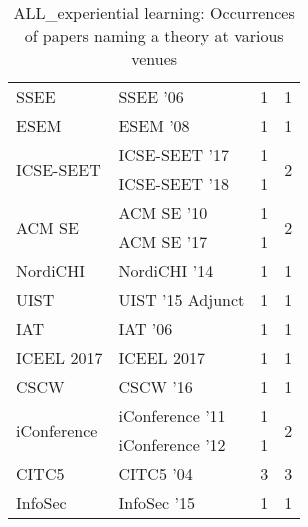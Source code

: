 \begin{table*}[t]
\begin{tabular}{llrr}
\multirow{1}{*}{SSEE } & SSEE '06 & 1 & \multirow{1}{*}{1}\\
\multirow{1}{*}{ESEM } & ESEM '08 & 1 & \multirow{1}{*}{1}\\
\multirow{2}{*}{ICSE-SEET } & ICSE-SEET '17 & 1 & \multirow{2}{*}{2}\\
& ICSE-SEET '18 & 1 &\\
\multirow{2}{*}{ACM SE } & ACM SE '10 & 1 & \multirow{2}{*}{2}\\
& ACM SE '17 & 1 &\\
\multirow{1}{*}{NordiCHI } & NordiCHI '14 & 1 & \multirow{1}{*}{1}\\
\multirow{1}{*}{UIST } & UIST '15 Adjunct & 1 & \multirow{1}{*}{1}\\
\multirow{1}{*}{IAT } & IAT '06 & 1 & \multirow{1}{*}{1}\\
\multirow{1}{*}{ICEEL 2017} & ICEEL 2017 & 1 & \multirow{1}{*}{1}\\
\multirow{1}{*}{CSCW } & CSCW '16 & 1 & \multirow{1}{*}{1}\\
\multirow{2}{*}{iConference } & iConference '11 & 1 & \multirow{2}{*}{2}\\
& iConference '12 & 1 &\\
\multirow{1}{*}{CITC5 } & CITC5 '04 & 3 & \multirow{1}{*}{3}\\
\multirow{1}{*}{InfoSec } & InfoSec '15 & 1 & \multirow{1}{*}{1}\\
\end{tabular}
\caption{ALL\_experiential learning: Occurrences of papers naming a theory at various venues}
\end{table*}